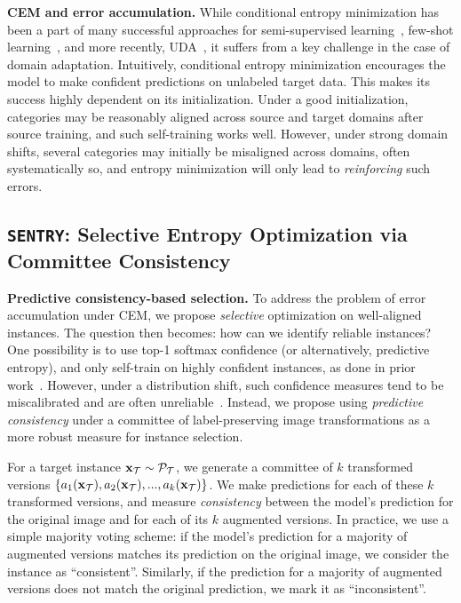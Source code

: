 \documentclass[10pt,twocolumn,letterpaper]{article}
\newcommand{\method}{\texttt{SENTRY}\xspace}
\begin{document}
\noindent \textbf{CEM and error accumulation.} While conditional entropy minimization has been a part of many successful approaches for semi-supervised learning~\cite{grandvalet2005semi,berthelot2019mixmatch}, few-shot learning~\cite{dhillon2019baseline}, and more recently, UDA~\cite{saito2019semi,li2020rethinking}, it suffers from a key challenge in the case of domain adaptation. Intuitively, conditional entropy minimization encourages the model to make confident predictions on unlabeled target data. This makes its success highly dependent on its initialization. Under a good initialization, categories may be reasonably aligned across source and target domains after source training, and such self-training works well. However, under strong domain shifts, several categories may initially be misaligned across domains, often systematically so, and entropy minimization will only lead to \emph{reinforcing} such errors.

\vspace{-4pt}
\subsection{\method: Selective Entropy Optimization via Committee Consistency}
\vspace{-4pt}

\noindent \textbf{Predictive consistency-based selection.} To address the problem of error accumulation under CEM, we propose \emph{selective} optimization on well-aligned instances. The question then becomes: how can we identify reliable instances? One possibility is to use top-1 softmax confidence (or alternatively, predictive entropy), and only self-train on highly confident instances, as done in prior work~\cite{tan2019generalized}. However, under a distribution shift, such confidence measures tend to be miscalibrated and are often unreliable~\cite{snoek2019can}. Instead, we propose using \emph{predictive consistency} under a committee of label-preserving image transformations as a more robust measure for instance selection.

For a target instance $\mathbf{x}_{\mathcal{T}} \sim \mathcal{P}_{\mathcal{T}}$, we generate a committee of $k$ transformed versions $\{a_1(\mathbf{x}_{\mathcal{T}}), a_2(\mathbf{x}_{\mathcal{T}}), ..., a_k(\mathbf{x}_{\mathcal{T}})\}$. 
We make predictions for each of these $k$ transformed versions, and measure \emph{consistency} between the model's prediction for the original image and for each of its $k$ augmented versions. In practice, we use a simple majority voting scheme: if the model's prediction for a majority of augmented versions matches its prediction on the original image, we consider the instance as ``consistent''. Similarly, if the prediction for a majority of augmented versions does not match the original prediction, we mark it as ``inconsistent''. 
\end{document}
